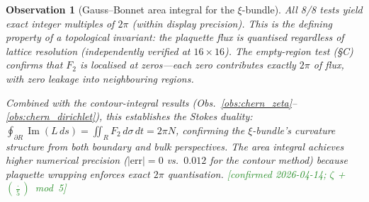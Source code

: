 \documentclass[11pt, a4paper]{article}
\theoremstyle{definition}
\theoremstyle{plain}
\newtheorem{observation}[theorem]{Observation}
\newcommand{\xif}{\xi}                      %
\begin{document}
\begin{observation}[Gauss--Bonnet area integral for the $\xif$-bundle]
\noindent
All 8/8 tests yield \emph{exact} integer multiples of $2\pi$
(within display precision).
This is the defining property of a topological invariant:
the plaquette flux is quantised regardless of lattice resolution
(independently verified at $16\!\times\!16$).
The empty-region test (\S C) confirms that
$F_2$ is localised at zeros---each zero contributes
exactly $2\pi$ of flux, with zero leakage into neighbouring regions.

\smallskip\noindent
Combined with the contour-integral results
(Obs.~\ref{obs:chern_zeta}--\ref{obs:chern_dirichlet}),
this establishes the Stokes duality:
$\oint_{\partial R}\!\operatorname{Im}(L\,ds)
= \iint_R F_2\,d\sigma\,dt = 2\pi N$,
confirming the $\xif$-bundle's curvature structure
from both boundary and bulk perspectives.
The area integral achieves higher numerical precision
($|\mathrm{err}|=0$ vs.\ $0.012$ for the contour method)
because plaquette wrapping enforces exact $2\pi$ quantisation.
\textcolor{ForestGreen}{[confirmed 2026-04-14; $\zeta$ + $(\frac{\cdot}{5})$~mod~5]}
\end{observation}
\end{document}
